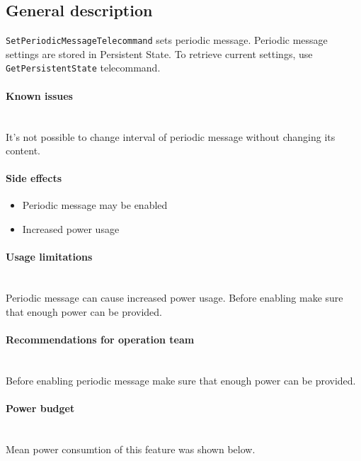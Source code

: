 

\subsection{General description}
\texttt{SetPeriodicMessageTelecommand} sets periodic message. Periodic message settings are stored in Persistent State. To retrieve current settings, use \texttt{GetPersistentState} telecommand. 

\paragraph{Known issues} \mbox{} \\
It's not possible to change interval of periodic message without changing its content.

\paragraph{Side effects}
\begin{itemize}
	\item Periodic message may be enabled
	\item Increased power usage
\end{itemize}

\paragraph{Usage limitations} \mbox{} \\
Periodic message can cause increased power usage. Before enabling make sure that enough power can be provided.

\paragraph{Recommendations for operation team} \mbox{} \\
Before enabling periodic message make sure that enough power can be provided.

\paragraph{Power budget} \mbox{} \\
Mean power consumtion of this feature was shown below.

